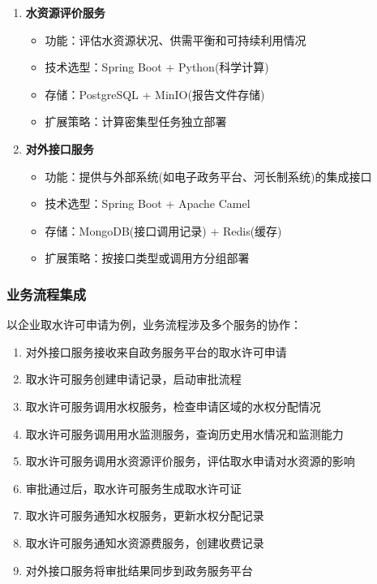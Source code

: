 \begin{enumerate}
  \begin{itemize}
  \tightlist
  \item
    功能：水资源费计算、账单生成和缴费管理
  \item
    技术选型：Spring Boot + Redis
  \item
    存储：PostgreSQL + Redis(缓存)
  \item
    扩展策略：按行政区域或缴费单位类型分片
  \end{itemize}
\item
  \textbf{水资源评价服务}

  \begin{itemize}
  \tightlist
  \item
    功能：评估水资源状况、供需平衡和可持续利用情况
  \item
    技术选型：Spring Boot + Python(科学计算)
  \item
    存储：PostgreSQL + MinIO(报告文件存储)
  \item
    扩展策略：计算密集型任务独立部署
  \end{itemize}
\item
  \textbf{对外接口服务}

  \begin{itemize}
  \tightlist
  \item
    功能：提供与外部系统(如电子政务平台、河长制系统)的集成接口
  \item
    技术选型：Spring Boot + Apache Camel
  \item
    存储：MongoDB(接口调用记录) + Redis(缓存)
  \item
    扩展策略：按接口类型或调用方分组部署
  \end{itemize}
\end{enumerate}

\subsubsection{业务流程集成}\label{ux4e1aux52a1ux6d41ux7a0bux96c6ux6210}

以企业取水许可申请为例，业务流程涉及多个服务的协作：

\begin{enumerate}
\def\labelenumi{\arabic{enumi}.}
\tightlist
\item
  对外接口服务接收来自政务服务平台的取水许可申请
\item
  取水许可服务创建申请记录，启动审批流程
\item
  取水许可服务调用水权服务，检查申请区域的水权分配情况
\item
  取水许可服务调用用水监测服务，查询历史用水情况和监测能力
\item
  取水许可服务调用水资源评价服务，评估取水申请对水资源的影响
\item
  审批通过后，取水许可服务生成取水许可证
\item
  取水许可服务通知水权服务，更新水权分配记录
\item
  取水许可服务通知水资源费服务，创建收费记录
\item
  对外接口服务将审批结果同步到政务服务平台
\end{enumerate}

